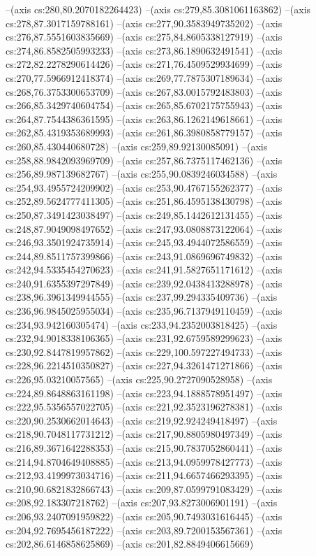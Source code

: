 --(axis cs:280,80.2070182264423)
--(axis cs:279,85.3081061163862)
--(axis cs:278,87.3017159788161)
--(axis cs:277,90.3583949735202)
--(axis cs:276,87.5551603835669)
--(axis cs:275,84.8605338127919)
--(axis cs:274,86.8582505993233)
--(axis cs:273,86.1890632491541)
--(axis cs:272,82.2278290614426)
--(axis cs:271,76.4509529934699)
--(axis cs:270,77.5966912418374)
--(axis cs:269,77.7875307189634)
--(axis cs:268,76.3753300653709)
--(axis cs:267,83.0015792483803)
--(axis cs:266,85.3429740604754)
--(axis cs:265,85.6702175755943)
--(axis cs:264,87.7544386361595)
--(axis cs:263,86.1262149618661)
--(axis cs:262,85.4319353689993)
--(axis cs:261,86.3980858779157)
--(axis cs:260,85.430440680728)
--(axis cs:259,89.92130085091)
--(axis cs:258,88.9842093969709)
--(axis cs:257,86.7375117462136)
--(axis cs:256,89.987139682767)
--(axis cs:255,90.0839246034588)
--(axis cs:254,93.4955724209902)
--(axis cs:253,90.4767155262377)
--(axis cs:252,89.5624777411305)
--(axis cs:251,86.4595138430798)
--(axis cs:250,87.3491423038497)
--(axis cs:249,85.1442612131455)
--(axis cs:248,87.9049098497652)
--(axis cs:247,93.0808873122064)
--(axis cs:246,93.3501924735914)
--(axis cs:245,93.4944072586559)
--(axis cs:244,89.8511757399866)
--(axis cs:243,91.0869696749832)
--(axis cs:242,94.5335454270623)
--(axis cs:241,91.5827651171612)
--(axis cs:240,91.6355397297849)
--(axis cs:239,92.0438413288978)
--(axis cs:238,96.3961349944555)
--(axis cs:237,99.294335409736)
--(axis cs:236,96.9845025955034)
--(axis cs:235,96.7137949110459)
--(axis cs:234,93.942160305474)
--(axis cs:233,94.2352003818425)
--(axis cs:232,94.9018338106365)
--(axis cs:231,92.6759589299623)
--(axis cs:230,92.8447819957862)
--(axis cs:229,100.597227494733)
--(axis cs:228,96.2214510350827)
--(axis cs:227,94.3261471271866)
--(axis cs:226,95.03210057565)
--(axis cs:225,90.2727090528958)
--(axis cs:224,89.8648863161198)
--(axis cs:223,94.1888578951497)
--(axis cs:222,95.5356557022705)
--(axis cs:221,92.3523196278381)
--(axis cs:220,90.2530662014643)
--(axis cs:219,92.924249418497)
--(axis cs:218,90.7048117731212)
--(axis cs:217,90.8805980497349)
--(axis cs:216,89.3671642288353)
--(axis cs:215,90.7837052860441)
--(axis cs:214,94.8704649408885)
--(axis cs:213,94.0959978427773)
--(axis cs:212,93.4199973034716)
--(axis cs:211,94.6657466293395)
--(axis cs:210,90.6821832866743)
--(axis cs:209,87.0599791083429)
--(axis cs:208,92.183307218762)
--(axis cs:207,93.8273006901191)
--(axis cs:206,93.2407091959822)
--(axis cs:205,90.7493031616445)
--(axis cs:204,92.7695456187222)
--(axis cs:203,89.7200153567361)
--(axis cs:202,86.6146858625869)
--(axis cs:201,82.8849406615669)
